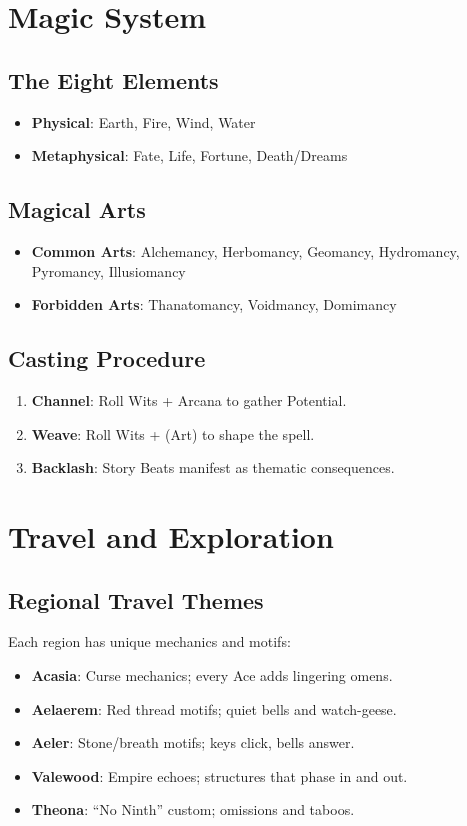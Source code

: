 \documentclass[11pt,twoside]{article}
\begin{document}
\section{Magic System}

\subsection{The Eight Elements}
\begin{itemize}[leftmargin=*]
    \item \textbf{Physical}: Earth, Fire, Wind, Water
    \item \textbf{Metaphysical}: Fate, Life, Fortune, Death/Dreams
\end{itemize}

\subsection{Magical Arts}
\begin{itemize}[leftmargin=*]
    \item \textbf{Common Arts}: Alchemancy, Herbomancy, Geomancy, Hydromancy, Pyromancy, Illusiomancy
    \item \textbf{Forbidden Arts}: Thanatomancy, Voidmancy, Domimancy
\end{itemize}

\subsection{Casting Procedure}
\begin{enumerate}[leftmargin=*]
    \item \textbf{Channel}: Roll Wits + Arcana to gather Potential.
    \item \textbf{Weave}: Roll Wits + (Art) to shape the spell.
    \item \textbf{Backlash}: Story Beats manifest as thematic consequences.
\end{enumerate}

\section{Travel and Exploration}

\subsection{Regional Travel Themes}
Each region has unique mechanics and motifs:
\begin{itemize}[leftmargin=*]
    \item \textbf{Acasia}: Curse mechanics; every Ace adds lingering omens.
    \item \textbf{Aelaerem}: Red thread motifs; quiet bells and watch-geese.
    \item \textbf{Aeler}: Stone/breath motifs; keys click, bells answer.
    \item \textbf{Valewood}: Empire echoes; structures that phase in and out.
    \item \textbf{Theona}: ``No Ninth'' custom; omissions and taboos.
\end{itemize}
\end{document}
